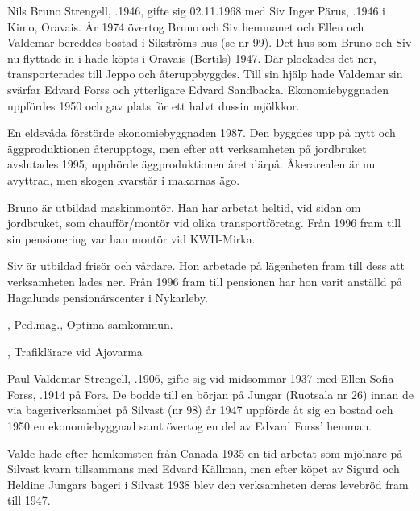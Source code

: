 
Nils Bruno Strengell, .1946, gifte sig 02.11.1968 med Siv Inger Pärus, .1946 i Kimo, Oravais. År 1974 övertog Bruno och Siv hemmanet och Ellen och Valdemar bereddes bostad i Sikströms hus (se nr 99). Det hus som Bruno och Siv nu flyttade in i hade köpts i Oravais (Bertils) 1947. Där plockades det ner, transporterades till Jeppo och återuppbyggdes. Till sin hjälp hade Valdemar sin svärfar Edvard Forss och ytterligare Edvard Sandbacka. Ekonomiebyggnaden uppfördes 1950 och gav plats för ett halvt dussin mjölkkor.

En eldsvåda förstörde ekonomiebyggnaden 1987. Den byggdes upp på nytt och äggproduktionen återupptogs, men efter att verksamheten på jordbruket avslutades 1995, upphörde äggproduktionen året därpå. Åkerarealen är nu avyttrad, men skogen kvarstår i makarnas ägo.

Bruno är utbildad maskinmontör. Han har arbetat heltid, vid sidan om jordbruket, som chaufför/montör vid olika transportföretag. Från 1996 fram till sin pensionering var han montör vid KWH-Mirka.

Siv är utbildad frisör och vårdare. Hon arbetade på lägenheten fram till dess att verksamheten lades ner. Från 1996 fram till pensionen har hon varit anställd på Hagalunds pensionärscenter i Nykarleby.
\begin{jhchildren}
  \item {}, Ped.mag., Optima samkommun.
  \item {}, Trafiklärare vid Ajovarma
\end{jhchildren}


Paul Valdemar Strengell, .1906, gifte sig vid midsommar 1937 med Ellen Sofia Forss, .1914 på Fors. De bodde till en början på Jungar (Ruotsala nr 26) innan de via bageriverksamhet på Silvast (nr 98) år 1947 uppförde åt sig en bostad och 1950 en ekonomiebyggnad samt övertog en del av Edvard Forss' hemman.

Valde hade efter hemkomsten från Canada 1935 en tid arbetat som mjölnare på Silvast kvarn tillsammans med Edvard Källman, men efter köpet av Sigurd och Heldine Jungars bageri i Silvast 1938 blev den verksamheten deras levebröd fram till 1947.
\begin{jhchildren}
  \item {}
  \item {}
  \item {}
  \item {}
  \item {}
  \item {}
\end{jhchildren}

